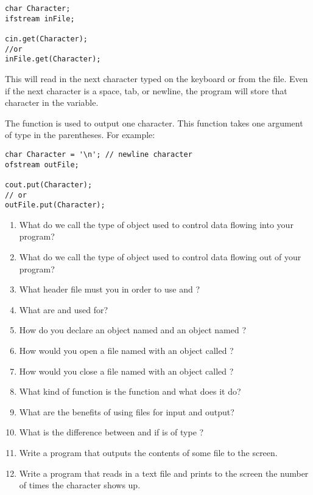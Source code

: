 \noindent\begin{minipage}{\linewidth}\begin{lstlisting}
char Character;
ifstream inFile;

cin.get(Character);
//or
inFile.get(Character);
\end{lstlisting}\end{minipage}

This will read in the next character typed on the keyboard or from the file. 
Even if the next character is a space, tab, or newline, the program will store that character in the variable. 

The  function is used to output one character. 
This function takes one argument of type  in the parentheses. 
For example:

\noindent\begin{minipage}{\linewidth}\begin{lstlisting}
char Character = '\n'; // newline character
ofstream outFile;

cout.put(Character);
// or
outFile.put(Character);
\end{lstlisting}\end{minipage}


\begin{enumerate}
\item What do we call the type of object used to control data flowing into your program?
\item What do we call the type of object used to control data flowing out of your program?
\item What header file must you  in order to use  and ?
\item What are  and  used for?
\item How do you declare an  object named  and an  object named ?
\item How would you open a file named  with an  object called ?
\item How would you close a file named  with an  object called ?
\item What kind of function is the  function and what does it do?
\item What are the benefits of using files for input and output?
\item What is the difference between  and  if  is of type ?
\item Write a program that outputs the contents of some file to the screen.
\item Write a program that reads in a text file and prints to the screen the number of times the character  shows up.
\end{enumerate}

